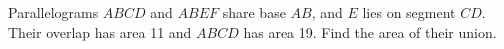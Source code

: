 Parallelograms $ ABCD $ and $ ABEF $ share base $ AB $, and $ E $ lies on segment $ CD $. Their overlap has area 11 and $ ABCD $ has area 19. Find the area of their union.
